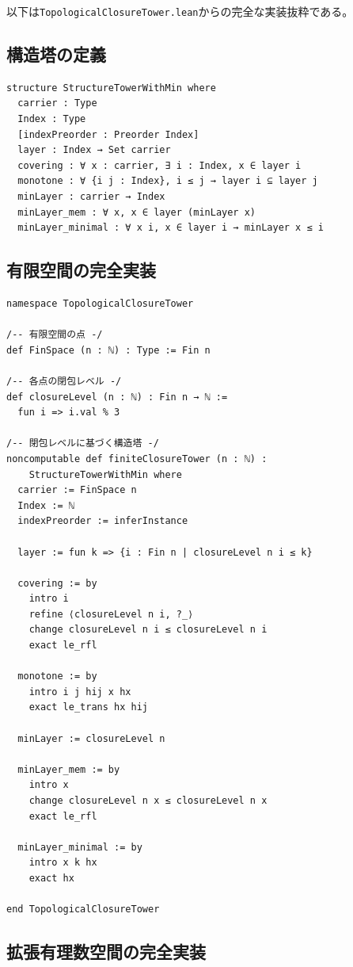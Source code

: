 \documentclass[a4paper,12pt]{ltjsarticle}
\theoremstyle{definition}
\begin{document}
以下は\texttt{TopologicalClosureTower.lean}からの完全な実装抜粋である。

\subsection{構造塔の定義}

\begin{lstlisting}[language=Lean]
structure StructureTowerWithMin where
  carrier : Type
  Index : Type
  [indexPreorder : Preorder Index]
  layer : Index → Set carrier
  covering : ∀ x : carrier, ∃ i : Index, x ∈ layer i
  monotone : ∀ {i j : Index}, i ≤ j → layer i ⊆ layer j
  minLayer : carrier → Index
  minLayer_mem : ∀ x, x ∈ layer (minLayer x)
  minLayer_minimal : ∀ x i, x ∈ layer i → minLayer x ≤ i
\end{lstlisting}

\subsection{有限空間の完全実装}

\begin{lstlisting}[language=Lean]
namespace TopologicalClosureTower

/-- 有限空間の点 -/
def FinSpace (n : ℕ) : Type := Fin n

/-- 各点の閉包レベル -/
def closureLevel (n : ℕ) : Fin n → ℕ :=
  fun i => i.val % 3

/-- 閉包レベルに基づく構造塔 -/
noncomputable def finiteClosureTower (n : ℕ) :
    StructureTowerWithMin where
  carrier := FinSpace n
  Index := ℕ
  indexPreorder := inferInstance

  layer := fun k => {i : Fin n | closureLevel n i ≤ k}

  covering := by
    intro i
    refine ⟨closureLevel n i, ?_⟩
    change closureLevel n i ≤ closureLevel n i
    exact le_rfl

  monotone := by
    intro i j hij x hx
    exact le_trans hx hij

  minLayer := closureLevel n

  minLayer_mem := by
    intro x
    change closureLevel n x ≤ closureLevel n x
    exact le_rfl

  minLayer_minimal := by
    intro x k hx
    exact hx

end TopologicalClosureTower
\end{lstlisting}

\subsection{拡張有理数空間の完全実装}
\end{document}
